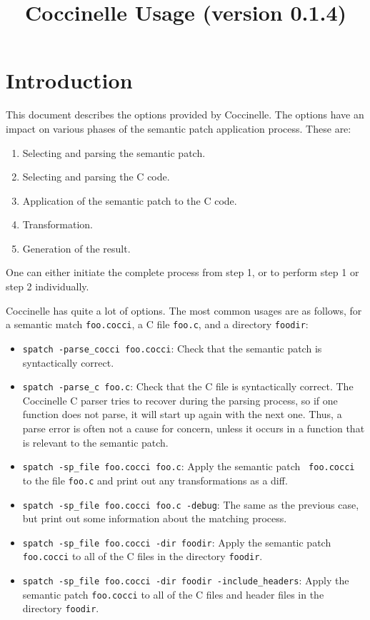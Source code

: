 \documentclass{article}
\title{Coccinelle Usage (version 0.1.4)}
\begin{document}
\maketitle

\section{Introduction}

This document describes the options provided by Coccinelle.  The options
have an impact on various phases of the semantic patch application
process.  These are:

\begin{enumerate}
\item Selecting and parsing the semantic patch.
\item Selecting and parsing the C code.
\item Application of the semantic patch to the C code.
\item Transformation.
\item Generation of the result.
\end{enumerate}

\noindent
One can either initiate the complete process from step 1, or
to perform step 1 or step 2 individually.

Coccinelle has quite a lot of options.  The most common usages are as
follows, for a semantic match {\tt foo.cocci}, a C file {\tt foo.c}, and a
directory {\tt foodir}:

\begin{itemize}
\item {\tt spatch -parse\_cocci foo.cocci}: Check that the semantic patch
  is syntactically correct.
\item {\tt spatch -parse\_c foo.c}: Check that the C file
  is syntactically correct.  The Coccinelle C parser tries to recover
  during the parsing process, so if one function does not parse, it will
  start up again with the next one.  Thus, a parse error is often not a
  cause for concern, unless it occurs in a function that is relevant to the
  semantic patch.
\item {\tt spatch -sp\_file foo.cocci foo.c}: Apply the semantic patch {\tt
    foo.cocci} to the file {\tt foo.c} and print out any transformations as a
  diff.
\item {\tt spatch -sp\_file foo.cocci foo.c -debug}:  The same as the
  previous case, but print out some information about the matching process.
\item {\tt spatch -sp\_file foo.cocci -dir foodir}:  Apply the semantic
  patch {\tt foo.cocci} to all of the C files in the directory {\tt foodir}.
\item {\tt spatch -sp\_file foo.cocci -dir foodir -include\_headers}:  Apply
  the semantic patch {\tt foo.cocci} to all of the C files and header files
  in the directory {\tt foodir}. 
\end{itemize}
\end{document}
